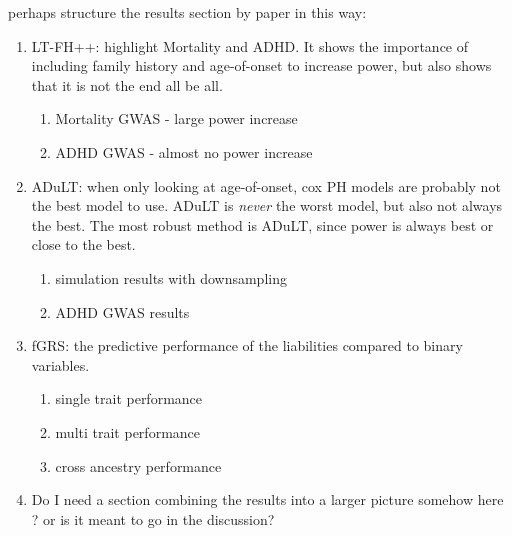 


perhaps structure the results section by paper in this way:

\begin{enumerate}
	\item LT-FH++: highlight Mortality and ADHD. It shows the importance of including family history and age-of-onset to increase power, but also shows that it is not the end all be all.
	\begin{enumerate}
		\item Mortality GWAS - large power increase
		\item ADHD GWAS - almost no power increase
	\end{enumerate}
	\item ADuLT: when only looking at age-of-onset, cox PH models are probably not the best model to use. ADuLT is \textit{never} the worst model, but also not always the best. The most robust method is ADuLT, since power is always best or close to the best.
	\begin{enumerate}
		\item simulation results with downsampling
		\item ADHD GWAS results
	\end{enumerate}
	\item fGRS: the predictive performance of the liabilities compared to binary variables.
	\begin{enumerate}
		\item single trait performance
		\item multi trait performance 
		\item cross ancestry performance
	\end{enumerate}	
\item Do I need a section combining the results into a larger picture somehow here ? or is it meant to go in the discussion?
\end{enumerate}

